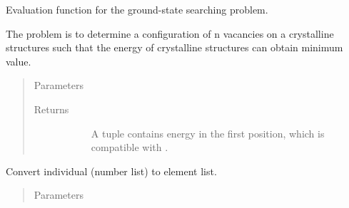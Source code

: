 \documentclass[letterpaper,10pt,english]{sphinxmanual}
\begin{document}
\begin{fulllineitems}
\begin{fulllineitems}
\end{fulllineitems}


\begin{fulllineitems}
\label{\detokenize{pygace.examples.sto:pygace.examples.sto.sto_gace.STOApp.evalEnergy}}
Evaluation function for the ground-state searching problem.

The problem is to determine a configuration of n vacancies
on a crystalline structures such that the energy of crystalline
structures can obtain minimum value.
\begin{quote}\begin{description}
\item[{Parameters}] \leavevmode\begin{description}
\item[{}] \leavevmode
\end{description}

\item[{Returns}] \leavevmode\begin{description}
\item[{}] \leavevmode
A tuple contains energy in the first position, which is compatible
with .

\end{description}

\end{description}\end{quote}

\end{fulllineitems}


\begin{fulllineitems}
\label{\detokenize{pygace.examples.sto:pygace.examples.sto.sto_gace.STOApp.ind_to_elis}}
Convert individual (number list) to element list.
\begin{quote}\begin{description}
\item[{Parameters}] \leavevmode\begin{description}
\item[{}] \leavevmode
\end{description}


\end{description}
\end{quote}
\end{fulllineitems}
\end{fulllineitems}
\end{document}
